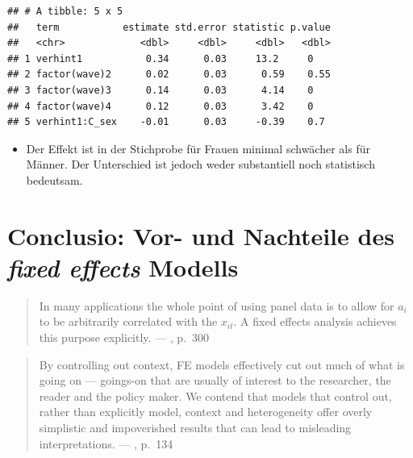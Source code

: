 \documentclass[]{book}
\providecommand{\tightlist}{%
  \setlength{\itemsep}{0pt}\setlength{\parskip}{0pt}}
\begin{document}
\begin{verbatim}
## # A tibble: 5 x 5
##   term           estimate std.error statistic p.value
##   <chr>             <dbl>     <dbl>     <dbl>   <dbl>
## 1 verhint1           0.34      0.03     13.2     0   
## 2 factor(wave)2      0.02      0.03      0.59    0.55
## 3 factor(wave)3      0.14      0.03      4.14    0   
## 4 factor(wave)4      0.12      0.03      3.42    0   
## 5 verhint1:C_sex    -0.01      0.03     -0.39    0.7
\end{verbatim}

\begin{itemize}
\tightlist
\item
  Der Effekt ist in der Stichprobe für Frauen minimal schwächer als für Männer. Der Unterschied ist jedoch weder substantiell noch statistisch bedeutsam.
\end{itemize}

\hypertarget{conclusio-vor--und-nachteile-des-fixed-effects-modells}{%
\section{\texorpdfstring{Conclusio: Vor- und Nachteile des \emph{fixed effects} Modells}{Conclusio: Vor- und Nachteile des fixed effects Modells}}\label{conclusio-vor--und-nachteile-des-fixed-effects-modells}}

\begin{quote}
In many applications the whole point of using panel data is to allow for \(a_i\) to be arbitrarily correlated with the \(x_{it}\). A fixed effects analysis achieves this purpose explicitly. --- \citet{wooldridge10}, p.~300
\end{quote}

\begin{quote}
By controlling out context, FE models effectively cut out much of what is going on --- goings-on that are usually of interest to the researcher, the reader and the policy maker. We contend that models that control out, rather than explicitly model, context and heterogeneity offer overly simplistic and impoverished results that can lead to misleading interpretations. --- \citet{bellExplainingFixedEffects2015}, p.~134
\end{quote}
\end{document}
